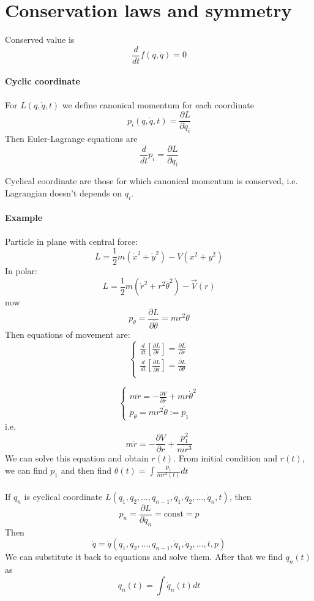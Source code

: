 \section{Conservation laws and symmetry}
Conserved value is
$$\frac{d}{dt} f(q,\dot{q}) = 0$$
\paragraph{Cyclic coordinate}
For $L(q,\dot{q},t)$ we define canonical momentum for each coordinate
$$p_i(q,\dot{q},t) = \frac{\partial L}{\partial \dot{q}_i}$$
Then Euler-Lagrange equations are
$$\frac{d}{dt} p_i = \frac{\partial L}{\partial q_i}$$

Cyclical coordinate are those for which canonical momentum  is conserved, i.e. Lagrangian doesn't depends on $q_i$.
\paragraph{Example}
Particle in plane with central force:
$$L = \frac{1}{2}m(\dot{x}^2 + \dot{y}^2)-V(x^2+y^2)$$
In polar:
$$L = \frac{1}{2}m(\dot{r}^2 + r^2 \dot{\theta}^2) - \vec{V}(r)$$
now
$$p_\theta = \frac{\partial L}{\partial \dot{\theta}} = mr^2\dot{\theta}$$
Then equations of movement are:
$$\begin{cases}
\frac{d}{dt} \left[ \frac{\partial L}{\partial \dot{r}} \right] = \frac{\partial L}{\partial r}\\
\frac{d}{dt} \left[ \frac{\partial L}{\partial \dot{\theta}} \right] = \frac{\partial L}{\partial \theta}\\
\end{cases}$$


$$\begin{cases}
m\ddot{r} = -\frac{\partial V}{\partial r} + mr\dot{\theta}^2\\
p_\theta = mr^2 \dot{\theta} := p_1
\end{cases}$$
i.e.
$$m\ddot{r} = -\frac{\partial V}{\partial r} + \frac{p_1^2}{mr^3}$$
We can solve this equation and obtain $r(t)$. From initial condition and $r(t)$, we can find $p_1$ and then find
$\theta(t) = \int \frac{p_1}{mr^2(t)}dt$
\paragraph{} If $q_n$ is cyclical coordinate $L(q_1, q_2,\dots,q_{n-1}, \dot{q}_1, \dot{q}_2,\dots, \dot{q}_n, t)$, then
$$p_n = \frac{\partial L}{\partial \dot{q}_n} = \text{const} = p$$
Then
$$\dot{q} = \dot{q} (q_1, q_2,\dots,q_{n-1}, \dot{q}_1, \dot{q}_2,\dots, t, p)$$
We can substitute it back to equations and solve them. After that we find $q_n(t)$ as
$$q_n(t) =\int \dot{q}_n (t) dt$$
